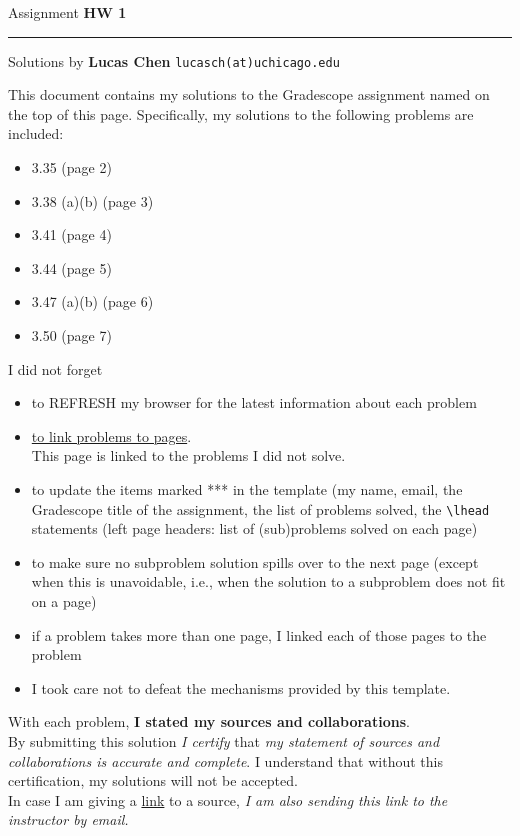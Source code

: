 \documentclass{amsart}
\begin{document}
\Large
\noindent
Assignment {\bf HW 1}   %

\medskip\noindent
\hrule


\medskip\noindent
Solutions by {\bf Lucas Chen} \qquad   %
  {\tt lucasch(at)uchicago.edu}      %

\vspace{0.5cm}

\noindent
This document contains my solutions to
the Gradescope assignment named on the top of this page.
Specifically, my solutions to the following problems
are included:

\vspace{0.4cm}
\begin{itemize}  %
\item 3.35 \quad (page 2)
\item 3.38 (a)(b) \quad (page 3)
\item 3.41 \quad (page 4)
\item 3.44 \quad (page 5)
\item 3.47 (a)(b) \quad (page 6)
\item 3.50 \quad (page 7)
\end{itemize}

\vspace{0.5cm}

\noindent
I did not forget 
\begin{itemize}
  \item to REFRESH my browser for the latest information
   about each problem
  \item \underline{to link problems to pages}.\\
  This page is linked to the problems I did not solve.
\item to update the items marked *** in the template
  (my name, email, the Gradescope title of the assignment,
  the list of problems solved, the \verb>\lhead> statements
  (left page headers: list of (sub)problems solved on each page)
\item to make sure no subproblem solution spills over to the next page
  (except when this is unavoidable, i.e., when the solution to a
  subproblem does not fit on a page)
\item if a problem takes more than one page, I linked
  each of those pages to the problem
\item I took care not to defeat the mechanisms provided by this template.
\end{itemize}
  With each problem, {\bf I stated my sources and collaborations}.\\
  By submitting this solution \emph{I certify} that
  \emph{my statement of sources and collaborations is accurate and complete}.
  I understand that without this certification, my solutions will not be accepted.\\
  In case I am giving a \underline{link} to a source, \emph{I am also sending this link
  to the instructor by email.}
  
\end{document}
